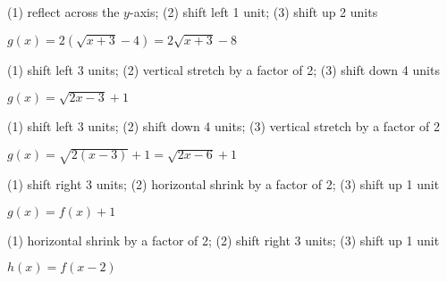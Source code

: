 \documentclass{ximera}
\begin{document}
\begin{question}
(1) reflect across the $y$-axis;  (2) shift left 1 unit;  (3) shift up 2 units
\begin{solution}
$g(x) = 2\left(\sqrt{x+3} - 4\right) = 2\sqrt{x+3} - 8$

\end{solution}

\end{question}

\begin{question}
(1) shift left 3 units; (2) vertical stretch by a factor of 2; (3) shift down 4 units
\begin{solution}
$g(x) = \sqrt{2x-3} + 1$
\end{solution}

\end{question}

\begin{question}
(1) shift left 3 units; (2) shift down 4 units; (3) vertical stretch by a factor of 2
\begin{solution}
$g(x) = \sqrt{2(x-3)} + 1 = \sqrt{2x-6}+1$

\end{solution}

\end{question}

\begin{question}
(1) shift right 3 units; (2) horizontal shrink by a factor of 2; (3) shift up 1 unit
\begin{solution}
$g(x)=f(x)+1$
\end{solution}

\end{question}

\begin{question}
(1) horizontal shrink by a factor of 2; (2) shift right 3 units; (3) shift up 1 unit


\begin{solution}
$h(x) = f(x-2)$ 


\end{solution}

\end{question}
\end{document}
